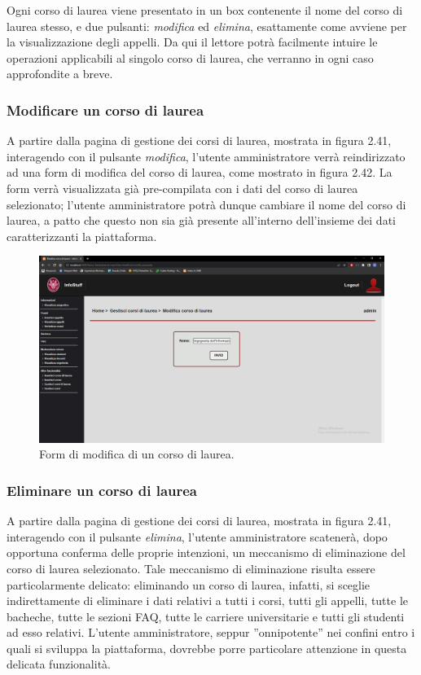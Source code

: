 \documentclass [a4paper,11pt]{book}
\begin{document}
Ogni corso di laurea viene presentato in un box contenente il nome del corso di laurea stesso, e due pulsanti: \emph{modifica} ed \emph{elimina}, esattamente come avviene per la visualizzazione degli appelli. Da qui il lettore potrà facilmente intuire le operazioni applicabili al singolo corso di laurea, che verranno in ogni caso approfondite a breve.

\medskip 

\subsubsection{Modificare un corso di laurea}

A partire dalla pagina di gestione dei corsi di laurea, mostrata in figura 2.41, interagendo con il pulsante \emph{modifica}, l'utente amministratore verrà reindirizzato ad una form di modifica del corso di laurea, come mostrato in figura 2.42. La form verrà visualizzata già pre-compilata con i dati del corso di laurea selezionato; l'utente amministratore potrà dunque cambiare il nome del corso di laurea, a patto che questo non sia già presente all'interno dell'insieme dei dati caratterizzanti la piattaforma.

\begin{figure}
\centering
\includegraphics[scale=0.3]{figura2-42.png}
\caption{Form di modifica di un corso di laurea.}
\end{figure}

\medskip

\subsubsection{Eliminare un corso di laurea}

A partire dalla pagina di gestione dei corsi di laurea, mostrata in figura 2.41, interagendo con il pulsante \emph{elimina}, l'utente amministratore scatenerà, dopo opportuna conferma delle proprie intenzioni, un meccanismo di eliminazione del corso di laurea selezionato. Tale meccanismo di eliminazione risulta essere particolarmente delicato: eliminando un corso di laurea, infatti, si sceglie indirettamente di eliminare i dati relativi a tutti i corsi, tutti gli appelli, tutte le bacheche, tutte le sezioni FAQ, tutte le carriere universitarie e tutti gli studenti ad esso relativi. L'utente amministratore, seppur ''onnipotente'' nei confini entro i quali si sviluppa la piattaforma, dovrebbe porre particolare attenzione in questa delicata funzionalità.
\end{document}

